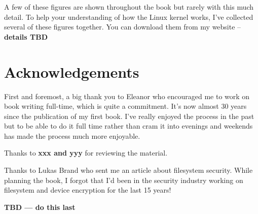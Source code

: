 A few of these figures are shown throughout the book but rarely with this much detail. To help your understanding of how the Linux kernel works, I've collected several of these figures together. You can download them from my website -- \textbf{details TBD}


\section{Acknowledgements}

First and foremost, a big thank you to Eleanor who encouraged me to work on book writing full-time, which is quite a commitment. It's now almost 30 years since the publication of my first book. I've really enjoyed the process in the past but to be able to do it full time rather than cram it into evenings and weekends has made the process much more enjoyable.

Thanks to \textbf{xxx and yyy} for reviewing the material. 

Thanks to Lukas Brand who sent me an article about filesystem security. While planning the book, I forgot that I'd been in the security industry working on filesystem and device encryption for the last 15 years!

\textbf{TBD --- do this last}



